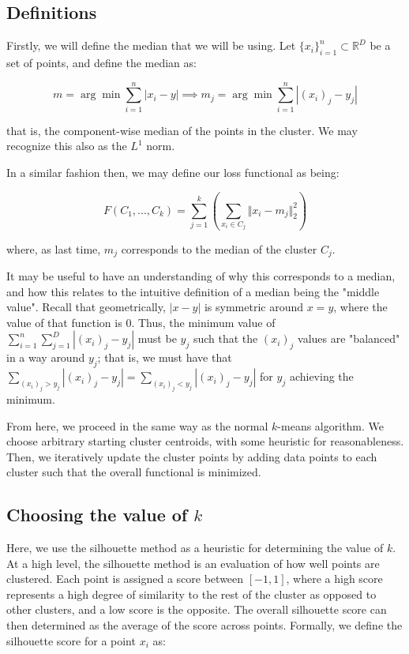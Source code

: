 \documentclass[sn-mathphys,Numbered]{sn-jnl}
\begin{document}
\subsection{Definitions}

Firstly, we will define the median that we will be using. Let $\{ x_i \}_{i=1}^n \subset \mathbb{R}^D$ be a set of points, and define the median as:

$$ m = \arg \min \sum_{i=1}^n | x_i - y | \implies m_j =  \arg \min \sum_{i=1}^n | (x_i)_j - y_j | $$

that is, the component-wise median of the points in the cluster. We may recognize this also as the $L^1$ norm.

In a similar fashion then, we may define our loss functional as being:

$$F(C_1,...,C_k) = \sum_{j=1}^k \left( \sum_{x_i \in C_j} \Vert x_i - m_j \Vert_2^2 \right)$$

where, as last time, $m_j$ corresponds to the median of the cluster $C_j$.

It may be useful to have an understanding of why this corresponds to a median, and how this relates to the intuitive definition of a median being the "middle value". Recall that geometrically, $|x - y|$ is symmetric around $x = y$, where the value of that function is $0$. Thus, the minimum value of $ \sum_{i=1}^n \sum_{j=1}^D | (x_i)_j - y_j | $ must be $y_j$ such that the $(x_i)_j$ values are "balanced" in a way around $y_j$; that is, we must have that $\sum_{(x_i)_j > y_j} |  (x_i)_j - y_j| = \sum_{(x_i)_j < y_j} |  (x_i)_j - y_j|$ for $y_j$ achieving the minimum.

From here, we proceed in the same way as the normal $k$-means algorithm. We choose arbitrary starting cluster centroids, with some heuristic for reasonableness. Then, we iteratively update the cluster points by adding data points to each cluster such that the overall functional is minimized.

\subsection{Choosing the value of $k$}

Here, we use the silhouette method as a heuristic for determining the value of $k$. At a high level, the silhouette method is an evaluation of how well points are clustered. Each point is assigned a score between $[-1,1]$, where a high score represents a high degree of similarity to the rest of the cluster as opposed to other clusters, and a low score is the opposite. The overall silhouette score can then determined as the average of the score across points. Formally, we define the silhouette score for a point $x_i$ as:
\end{document}
